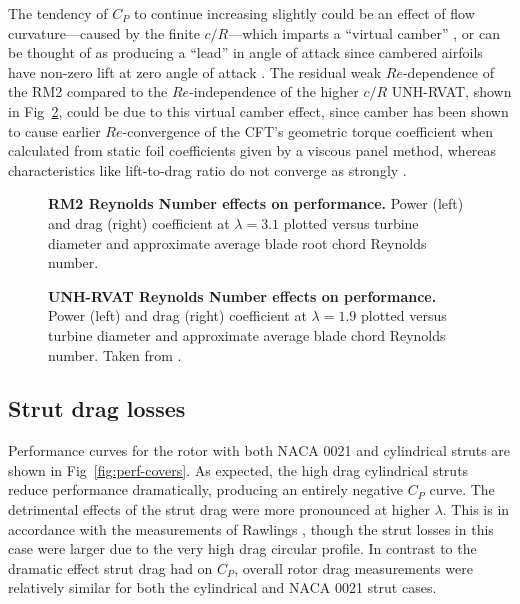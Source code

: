 \documentclass[10pt,letterpaper]{article}
\begin{document}
The tendency of $C_P$ to continue increasing slightly could be an effect of flow
curvature---caused by the finite $c/R$---which imparts a ``virtual camber''
\cite{Migliore1980}, or can be thought of as producing a ``lead'' in angle of
attack since cambered airfoils have non-zero lift at zero angle of attack
\cite{Goude2012}. The residual weak $Re$-dependence of the RM2 compared to the
$Re$-independence of the higher $c/R$ UNH-RVAT, shown in
Fig~\ref{fig:rvat-perf-re-dep}, could be due to this virtual camber effect,
since camber has been shown to cause earlier $Re$-convergence of the CFT's
geometric torque coefficient when calculated from static foil coefficients given
by a viscous panel method, whereas characteristics like lift-to-drag ratio do
not converge as strongly \cite{Bachant2016-Energies}.

\begin{figure}

    \caption{{\bf RM2 Reynolds Number effects on performance.} Power (left) and
    drag (right) coefficient at $\lambda=3.1$ plotted versus turbine diameter
    and approximate average blade root chord Reynolds number.}

    \label{fig:perf-re-dep}
\end{figure}

\begin{figure}

    \caption{{\bf UNH-RVAT Reynolds Number effects on performance.} Power (left)
    and drag (right) coefficient at $\lambda=1.9$ plotted versus turbine
    diameter and approximate average blade chord Reynolds number. Taken from
    \cite{Bachant2016-Energies}.}

    \label{fig:rvat-perf-re-dep}
\end{figure}


\subsection*{Strut drag losses}

Performance curves for the rotor with both NACA 0021 and cylindrical struts are
shown in Fig~\ref{fig:perf-covers}. As expected, the high drag cylindrical
struts reduce performance dramatically, producing an entirely negative $C_P$
curve. The detrimental effects of the strut drag were more pronounced at higher
$\lambda$. This is in accordance with the measurements of Rawlings
\cite{Rawlings2008}, though the strut losses in this case were larger due to the
very high drag circular profile. In contrast to the dramatic effect strut drag
had on $C_P$, overall rotor drag measurements were relatively similar for both
the cylindrical and NACA 0021 strut cases.
\end{document}
